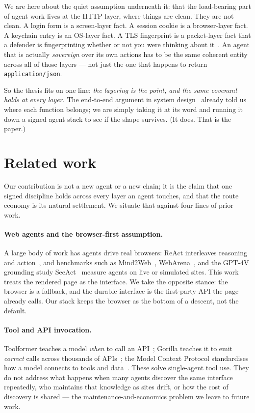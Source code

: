\documentclass[11pt]{article}
\begin{document}
We are here about the quiet assumption underneath it: that the load-bearing part
of agent work lives at the HTTP layer, where things are clean. They are not clean.
A login form is a screen-layer fact. A session cookie is a browser-layer fact. A
keychain entry is an OS-layer fact. A TLS fingerprint is a packet-layer fact that
a defender is fingerprinting whether or not you were thinking about
it~\cite{ja3,ja4}. An agent that is actually \emph{sovereign} over its own actions
has to be the same coherent entity across all of those layers --- not just the one
that happens to return \texttt{application/json}.

So the thesis fits on one line: \emph{the layering is the point, and the same
covenant holds at every layer.} The end-to-end argument in system
design~\cite{e2e} already told us where each function belongs; we are simply
taking it at its word and running it down a signed agent stack to see if the shape
survives. (It does. That is the paper.)


\section{Related work}

Our contribution is not a new agent or a new chain; it is the claim that one signed
discipline holds across every layer an agent touches, and that the route economy is
its natural settlement. We situate that against four lines of prior work.

\paragraph{Web agents and the browser-first assumption.} A large body of work has
agents drive real browsers: ReAct interleaves reasoning and action~\cite{react},
and benchmarks such as Mind2Web~\cite{mind2web}, WebArena~\cite{webarena}, and the
GPT-4V grounding study SeeAct~\cite{seeact} measure agents on live or simulated
sites. This work treats the rendered page as the interface. We take the opposite
stance: the browser is a fallback,
and the durable interface is the first-party API the page already calls. Our stack
keeps the browser as the bottom of a descent, not the default.

\paragraph{Tool and API invocation.} Toolformer teaches a model \emph{when} to call
an API~\cite{toolformer}; Gorilla teaches it to emit \emph{correct} calls across
thousands of APIs~\cite{gorilla}; the Model Context Protocol standardises how a model
connects to tools and data~\cite{mcp}. These solve single-agent tool use. They do not
address what happens when many agents discover the same interface repeatedly, who
maintains that knowledge as sites drift, or how the cost of discovery is shared --- the
maintenance-and-economics problem we leave to future work.
\end{document}
